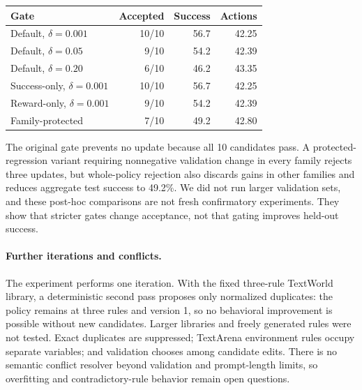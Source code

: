 \documentclass[11pt]{article}
\begin{document}
\begin{center}
\scriptsize
\setlength{\tabcolsep}{3pt}
\begin{tabular}{lrrr}
\toprule
Gate & Accepted & Success & Actions \\
\midrule
Default, $\delta=0.001$ & 10/10 & 56.7 & 42.25 \\
Default, $\delta=0.05$ & 9/10 & 54.2 & 42.39 \\
Default, $\delta=0.20$ & 6/10 & 46.2 & 43.35 \\
Success-only, $\delta=0.001$ & 10/10 & 56.7 & 42.25 \\
Reward-only, $\delta=0.001$ & 9/10 & 54.2 & 42.39 \\
Family-protected & 7/10 & 49.2 & 42.80 \\
\bottomrule
\end{tabular}
\end{center}

The original gate prevents no update because all 10 candidates pass.
A protected-regression variant requiring nonnegative validation change in every family rejects three updates, but whole-policy rejection also discards gains in other families and reduces aggregate test success to 49.2\%.
We did not run larger validation sets, and these post-hoc comparisons are not fresh confirmatory experiments.
They show that stricter gates change acceptance, not that gating improves held-out success.

\paragraph{Further iterations and conflicts.}
The experiment performs one iteration.
With the fixed three-rule TextWorld library, a deterministic second pass proposes only normalized duplicates: the policy remains at three rules and version 1, so no behavioral improvement is possible without new candidates.
Larger libraries and freely generated rules were not tested.
Exact duplicates are suppressed; TextArena environment rules occupy separate variables; and validation chooses among candidate edits.
There is no semantic conflict resolver beyond validation and prompt-length limits, so overfitting and contradictory-rule behavior remain open questions.
\end{document}
